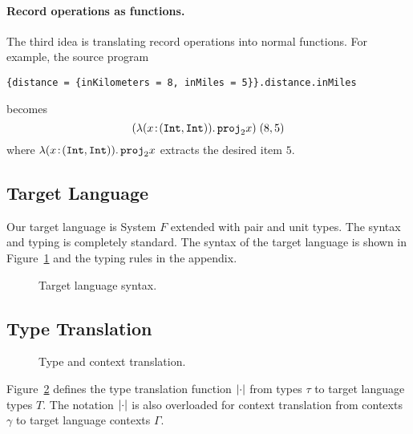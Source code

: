 \paragraph{Record operations as functions.}
The third idea is translating record operations into normal functions. For
example, the source program
\begin{lstlisting}
{distance = {inKilometers = 8, inMiles = 5}}.distance.inMiles
\end{lstlisting}
becomes
\[
(\lambda (x \!:\! (\texttt{Int}, \texttt{Int})).\, {\texttt{proj}}_{2} x) \; (8, 5)
\]
where $\lambda (x \!:\! (\texttt{Int}, \texttt{Int})).\, {\texttt{proj}}_{2} x$
extracts the desired item $5$.

\subsection{Target Language}

Our target language is System $F$ extended with pair and unit types. The syntax
and typing is completely standard. The syntax of the target language is shown in
Figure~\ref{fig:f-syntax} and the typing rules in the appendix.
\begin{figure}[h]
  
  \caption{Target language syntax.}
  \label{fig:f-syntax}
\end{figure}



\subsection{Type Translation}

\begin{figure}[h]


\caption{Type and context translation.}
\label{fig:type-and-context-translation}
\end{figure}

Figure~\ref{fig:type-and-context-translation} defines the type translation
function $\lvert \cdot \rvert$ from \name types $\tau$ to target language types $T$. The
notation $\lvert \cdot \rvert$ is also overloaded for context translation from \name
contexts $\gamma$ to target language contexts $\Gamma$.

